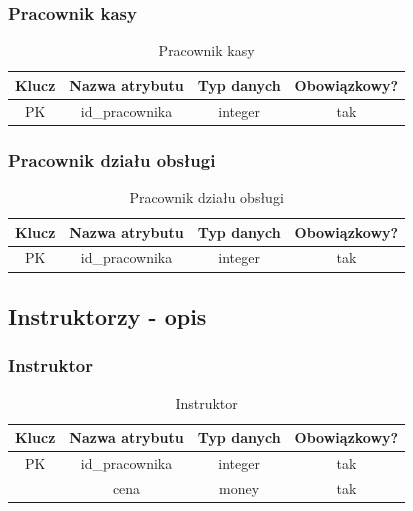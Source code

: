 \documentclass{sprawozdanie-agh}
\begin{document}
\subsubsection{Pracownik kasy}
\begin{table}[H]
	\centering
	\begin{tabular}{|c|c|c|c|}
		\hline
		Klucz & Nazwa atrybutu & Typ danych & Obowiązkowy? \\ \hline
		PK    & id\_pracownika & integer    & tak           \\ \hline
	\end{tabular}
	\caption{Pracownik kasy}
\end{table}

\subsubsection{Pracownik działu obsługi}
\begin{table}[H]
	\centering
	\begin{tabular}{|c|c|c|c|}
		\hline
		Klucz & Nazwa atrybutu & Typ danych & Obowiązkowy? \\ \hline
		PK    & id\_pracownika & integer    & tak           \\ \hline
	\end{tabular}
	\caption{Pracownik działu obsługi}
\end{table}

\subsection{Instruktorzy - opis}
\subsubsection{Instruktor}
\begin{table}[H]
	\centering
	\begin{tabular}{|c|c|c|c|}
		\hline
		Klucz & Nazwa atrybutu & Typ danych & Obowiązkowy? \\ \hline
		PK    & id\_pracownika & integer    & tak           \\ \hline
		      & cena           & money      & tak           \\ \hline
	\end{tabular}
	\caption{Instruktor}
\end{table}
\end{document}
